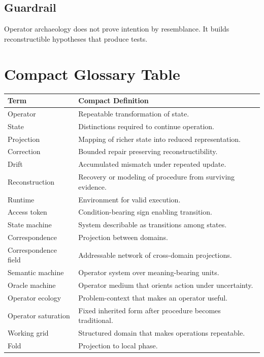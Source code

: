 \documentclass[11pt]{book}
\begin{document}
\subsection*{Guardrail}

Operator archaeology does not prove intention by resemblance. It builds reconstructible hypotheses that produce tests.

\section{Compact Glossary Table}

\begin{center}
\begin{tabular}{p{} p{}}
\hline
\textbf{Term} & \textbf{Compact Definition} \\
\hline
Operator & Repeatable transformation of state. \\
State & Distinctions required to continue operation. \\
Projection & Mapping of richer state into reduced representation. \\
Correction & Bounded repair preserving reconstructibility. \\
Drift & Accumulated mismatch under repeated update. \\
Reconstruction & Recovery or modeling of procedure from surviving evidence. \\
Runtime & Environment for valid execution. \\
Access token & Condition-bearing sign enabling transition. \\
State machine & System describable as transitions among states. \\
Correspondence & Projection between domains. \\
Correspondence field & Addressable network of cross-domain projections. \\
Semantic machine & Operator system over meaning-bearing units. \\
Oracle machine & Operator medium that orients action under uncertainty. \\
Operator ecology & Problem-context that makes an operator useful. \\
Operator saturation & Fixed inherited form after procedure becomes traditional. \\
Working grid & Structured domain that makes operations repeatable. \\
Fold & Projection to local phase. \\

\end{tabular}
\end{center}
\end{document}
